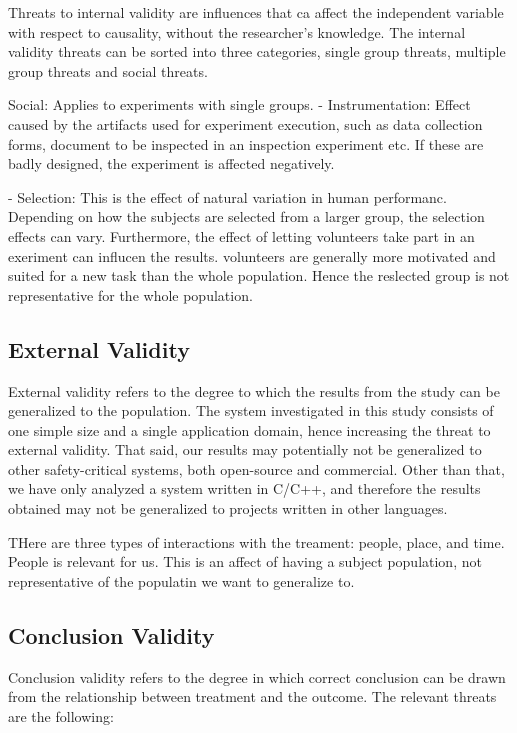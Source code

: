 Threats to internal validity are influences that ca affect the independent variable with respect to causality, without the researcher's knowledge. The internal validity threats can be sorted into three categories, single group threats, multiple group threats and social threats.


Social:  Applies to experiments with single groups. 
- Instrumentation: Effect caused by the artifacts used for experiment execution, such as data collection forms, document to be inspected in an inspection experiment etc. If these are badly designed, the experiment is affected negatively.

- Selection: This is the effect of natural variation in human performanc. Depending on how the subjects are selected from a larger group, the selection effects can vary. Furthermore, the effect of letting volunteers take part in an exeriment can influcen the results. volunteers are generally more motivated and suited for a new task than the whole population. Hence the reslected group is not representative for the whole population.



\subsection{External Validity}
\label{sub:external_validity}
External validity refers to the degree to which the results from the study can be generalized to the population\cite{Wohlin:2000:ESE:330775}. The system investigated in this study consists of one simple size and a single application domain, hence increasing the threat to external validity. That said, our results may potentially not be generalized to other safety-critical systems, both open-source and commercial. Other than that, we have only analyzed a system written in C/C++, and therefore the results obtained may not be generalized to projects written in other languages.

THere are three types of interactions with the treament: people, place, and time. People is relevant for us. This is an affect of having a subject population, not representative of the populatin we want to generalize to. 

\subsection{Conclusion Validity} %
\label{sub:conclusion_validity}
Conclusion validity refers to the degree in which correct conclusion can be drawn from the relationship between treatment and the outcome\cite{Wohlin:2000:ESE:330775}. The relevant threats are the following: 

